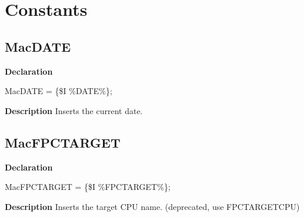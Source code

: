 \documentclass{report}
\newif\ifpdf
\begin{document}
\section{Constants}
\ifpdf
\subsection*{\large{\textbf{MacDATE}}\normalsize\hspace{1ex}\hrulefill}
\else
\subsection*{MacDATE}
\fi
\label{ok_include_environment-MacDATE}
\begin{list}{}{
\setlength{\itemindent}{0cm}
\setlength{\listparindent}{0cm}
\setlength{\leftmargin}{\evensidemargin}
\addtolength{\leftmargin}{\tmplength}
\settowidth{\labelsep}{X}
\addtolength{\leftmargin}{\labelsep}
\setlength{\labelwidth}{\tmplength}
}
\item[\textbf{Declaration}\hfill]
\ifpdf
\begin{flushleft}
\fi
\begin{ttfamily}
MacDATE = {\{}{\$}I {\%}DATE{\%}{\}};\end{ttfamily}

\ifpdf
\end{flushleft}
\fi

\par
\item[\textbf{Description}]
Inserts the current date.

\end{list}
\ifpdf
\subsection*{\large{\textbf{MacFPCTARGET}}\normalsize\hspace{1ex}\hrulefill}
\else
\subsection*{MacFPCTARGET}
\fi
\label{ok_include_environment-MacFPCTARGET}
\begin{list}{}{
\setlength{\itemindent}{0cm}
\setlength{\listparindent}{0cm}
\setlength{\leftmargin}{\evensidemargin}
\addtolength{\leftmargin}{\tmplength}
\settowidth{\labelsep}{X}
\addtolength{\leftmargin}{\labelsep}
\setlength{\labelwidth}{\tmplength}
}
\item[\textbf{Declaration}\hfill]
\ifpdf
\begin{flushleft}
\fi
\begin{ttfamily}
MacFPCTARGET = {\{}{\$}I {\%}FPCTARGET{\%}{\}};\end{ttfamily}

\ifpdf
\end{flushleft}
\fi

\par
\item[\textbf{Description}]
Inserts the target CPU name. (deprecated, use FPCTARGETCPU)

\end{list}
\ifpdf
\end{document}
